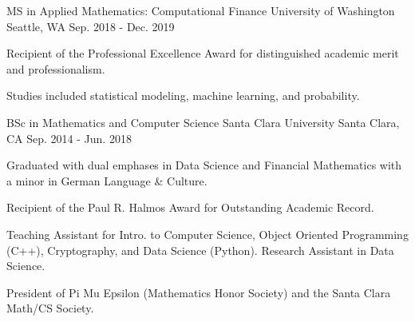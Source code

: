 
\begin{cventries}

  \cventry
    {MS in Applied Mathematics: Computational Finance} %
    {University of Washington} %
    {Seattle, WA} %
    {Sep. 2018 - Dec. 2019} %
    {
      \begin{cvitems} %
        \item {Recipient of the Professional Excellence Award for distinguished academic merit and professionalism.}
        \item {Studies included statistical modeling, machine learning, and probability.}
      \end{cvitems}
    }

  \cventry
    {BSc in Mathematics and Computer Science} %
    {Santa Clara University} %
    {Santa Clara, CA} %
    {Sep. 2014 - Jun. 2018} %
    {
      \begin{cvitems} %
        \item {Graduated with dual emphases in Data Science and Financial Mathematics with a minor in German Language \& Culture.}
        \item {Recipient of the Paul R. Halmos Award for Outstanding Academic Record.}
        \item {Teaching Assistant for Intro. to Computer Science, Object Oriented Programming (C++), Cryptography, and Data Science (Python). Research Assistant in Data Science.}
        \item {President of Pi Mu Epsilon (Mathematics Honor Society) and the Santa Clara Math/CS Society.}
      \end{cvitems}
    }

\end{cventries}
